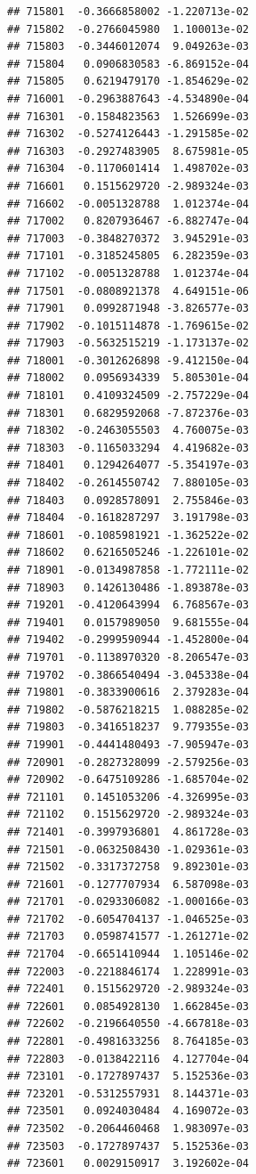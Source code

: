 \begin{frame}[fragile]
\begin{verbatim}
## 715801  -0.3666858002 -1.220713e-02
## 715802  -0.2766045980  1.100013e-02
## 715803  -0.3446012074  9.049263e-03
## 715804   0.0906830583 -6.869152e-04
## 715805   0.6219479170 -1.854629e-02
## 716001  -0.2963887643 -4.534890e-04
## 716301  -0.1584823563  1.526699e-03
## 716302  -0.5274126443 -1.291585e-02
## 716303  -0.2927483905  8.675981e-05
## 716304  -0.1170601414  1.498702e-03
## 716601   0.1515629720 -2.989324e-03
## 716602  -0.0051328788  1.012374e-04
## 717002   0.8207936467 -6.882747e-04
## 717003  -0.3848270372  3.945291e-03
## 717101  -0.3185245805  6.282359e-03
## 717102  -0.0051328788  1.012374e-04
## 717501  -0.0808921378  4.649151e-06
## 717901   0.0992871948 -3.826577e-03
## 717902  -0.1015114878 -1.769615e-02
## 717903  -0.5632515219 -1.173137e-02
## 718001  -0.3012626898 -9.412150e-04
## 718002   0.0956934339  5.805301e-04
## 718101   0.4109324509 -2.757229e-04
## 718301   0.6829592068 -7.872376e-03
## 718302  -0.2463055503  4.760075e-03
## 718303  -0.1165033294  4.419682e-03
## 718401   0.1294264077 -5.354197e-03
## 718402  -0.2614550742  7.880105e-03
## 718403   0.0928578091  2.755846e-03
## 718404  -0.1618287297  3.191798e-03
## 718601  -0.1085981921 -1.362522e-02
## 718602   0.6216505246 -1.226101e-02
## 718901  -0.0134987858 -1.772111e-02
## 718903   0.1426130486 -1.893878e-03
## 719201  -0.4120643994  6.768567e-03
## 719401   0.0157989050  9.681555e-04
## 719402  -0.2999590944 -1.452800e-04
## 719701  -0.1138970320 -8.206547e-03
## 719702  -0.3866540494 -3.045338e-04
## 719801  -0.3833900616  2.379283e-04
## 719802  -0.5876218215  1.088285e-02
## 719803  -0.3416518237  9.779355e-03
## 719901  -0.4441480493 -7.905947e-03
## 720901  -0.2827328099 -2.579256e-03
## 720902  -0.6475109286 -1.685704e-02
## 721101   0.1451053206 -4.326995e-03
## 721102   0.1515629720 -2.989324e-03
## 721401  -0.3997936801  4.861728e-03
## 721501  -0.0632508430 -1.029361e-03
## 721502  -0.3317372758  9.892301e-03
## 721601  -0.1277707934  6.587098e-03
## 721701  -0.0293306082 -1.000166e-03
## 721702  -0.6054704137 -1.046525e-03
## 721703   0.0598741577 -1.261271e-02
## 721704  -0.6651410944  1.105146e-02
## 722003  -0.2218846174  1.228991e-03
## 722401   0.1515629720 -2.989324e-03
## 722601   0.0854928130  1.662845e-03
## 722602  -0.2196640550 -4.667818e-03
## 722801  -0.4981633256  8.764185e-03
## 722803  -0.0138422116  4.127704e-04
## 723101  -0.1727897437  5.152536e-03
## 723201  -0.5312557931  8.144371e-03
## 723501   0.0924030484  4.169072e-03
## 723502  -0.2064460468  1.983097e-03
## 723503  -0.1727897437  5.152536e-03
## 723601   0.0029150917  3.192602e-04

\end{verbatim}
\end{frame}
